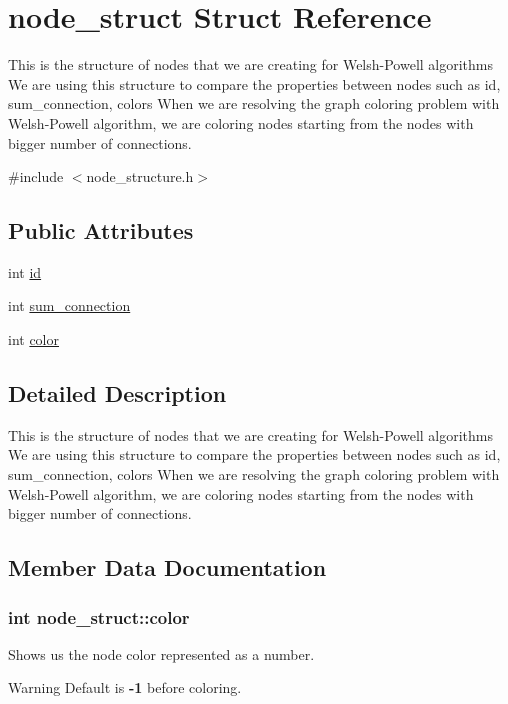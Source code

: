 \hypertarget{structnode__struct}{}\section{node\+\_\+struct Struct Reference}
\label{structnode__struct}


This is the structure of nodes that we are creating for Welsh-\/\+Powell algorithms We are using this structure to compare the properties between nodes such as id, sum\+\_\+connection, colors When we are resolving the graph coloring problem with Welsh-\/\+Powell algorithm, we are coloring nodes starting from the nodes with bigger number of connections.  




{\ttfamily \#include $<$node\+\_\+structure.\+h$>$}

\subsection*{Public Attributes}
\begin{DoxyCompactItemize}
\item 
int \hyperlink{structnode__struct_aad2827c7c2c957838445ff15ccc5a7f9}{id}
\item 
int \hyperlink{structnode__struct_aed6e2d1b4c5803f06fce262251d5aa40}{sum\+\_\+connection}
\item 
int \hyperlink{structnode__struct_a664de0d14e58986a763fa46ce06ea642}{color}
\end{DoxyCompactItemize}


\subsection{Detailed Description}
This is the structure of nodes that we are creating for Welsh-\/\+Powell algorithms We are using this structure to compare the properties between nodes such as id, sum\+\_\+connection, colors When we are resolving the graph coloring problem with Welsh-\/\+Powell algorithm, we are coloring nodes starting from the nodes with bigger number of connections. 

\subsection{Member Data Documentation}
\subsubsection[{\texorpdfstring{color}{color}}]{\setlength{\rightskip}{0pt plus 5cm}int node\+\_\+struct\+::color}\hypertarget{structnode__struct_a664de0d14e58986a763fa46ce06ea642}{}\label{structnode__struct_a664de0d14e58986a763fa46ce06ea642}
Shows us the node color represented as a number. \begin{DoxyWarning}{Warning}
Default is {\bfseries -\/1} before coloring. 
\end{DoxyWarning}
